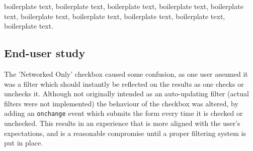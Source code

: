 boilerplate text, boilerplate text, boilerplate text, boilerplate text, boilerplate text, boilerplate text, boilerplate text, boilerplate text, boilerplate text, boilerplate text.

\subsection{End-user study}


The 'Networked Only' checkbox caused some confusion, as one user assumed it was a filter which should instantly be reflected on the results as one checks or unchecks it. Although not originally intended as an auto-updating filter (actual filters were not implemented) the behaviour of the checkbox was altered, by adding an \texttt{onchange} event which submits the form every time it is checked or unchecked. This results in an experience that is more aligned with the user's expectations, and is a reasonable compromise until a proper filtering system is put in place.















